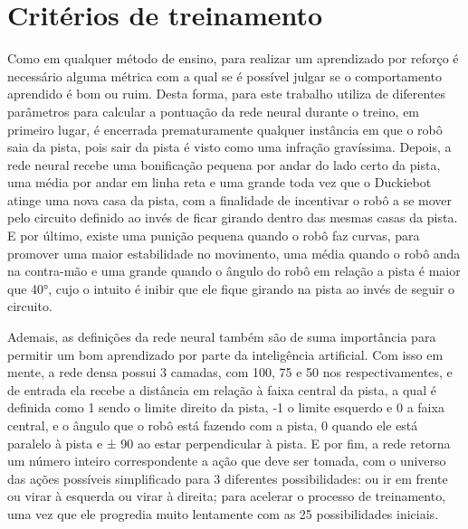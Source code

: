 \section{Critérios de treinamento}
\label{sec:criterios_de_treinamto}

Como em qualquer método de ensino, para realizar um aprendizado por reforço é necessário alguma métrica com a qual se é possível julgar se o comportamento aprendido é bom ou ruim. Desta forma, para este trabalho utiliza de diferentes parâmetros para calcular a pontuação da rede neural durante o treino, em primeiro lugar, é encerrada prematuramente qualquer instância em que o robô saia da pista, pois sair da pista é visto como uma infração gravíssima. Depois, a rede neural recebe uma bonificação pequena por andar do lado certo da pista, uma média por andar em linha reta e uma grande toda vez que o Duckiebot atinge uma nova casa da pista, com a finalidade de incentivar o robô a se mover pelo circuito definido ao invés de ficar girando dentro das mesmas casas da pista. E por último, existe uma punição pequena quando o robô faz curvas, para promover uma maior estabilidade no movimento, uma média quando o robô anda na contra-mão e uma grande quando o ângulo do robô em relação a pista é maior que 40°, cujo o intuito é inibir que ele fique girando na pista ao invés de seguir o circuito.
	
Ademais, as definições da rede neural também são de suma importância para permitir um bom aprendizado por parte da inteligência artificial. Com isso em mente, a rede densa possui 3 camadas, com 100, 75 e 50 nos respectivamentes, e de entrada ela recebe a distância em relação à faixa central da pista, a qual é definida como 1 sendo o limite direito da pista, -1 o limite esquerdo e 0 a faixa central, e o ângulo que o robô está fazendo com a pista, 0 quando ele está paralelo à pista e ± 90 ao estar perpendicular à pista. E por fim, a rede retorna um número inteiro correspondente a ação que deve ser tomada, com o universo das ações possíveis simplificado para 3 diferentes possibilidades: ou ir em frente ou virar à esquerda ou virar à direita; para acelerar o processo de treinamento, uma vez que ele progredia muito lentamente com as 25 possibilidades iniciais.
